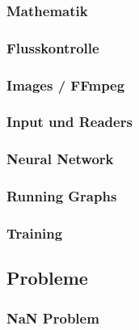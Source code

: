 \subsubsection{Mathematik}

\subsubsection{Flusskontrolle}

\subsubsection{Images / FFmpeg}

\subsubsection{Input und Readers}

\subsubsection{Neural Network}

\subsubsection{Running Graphs}

\subsubsection{Training}

\subsection{Probleme}

\subsubsection{NaN Problem}